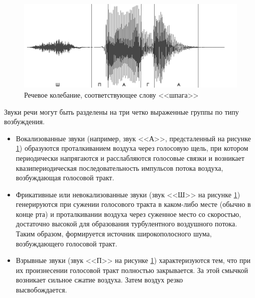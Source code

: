 \documentclass[a4paper,14pt,russian,utf8,nocolumnsxix,nocolumnxxxi,nocolumnxxxii]{eskdtext}
\begin{document}
\begin{figure}[h]	
	\centering
	\includegraphics[width=120mm]{shpaga_graph.png}			
	\caption{Речевое колебание, соответствующее слову <<шпага>>}
	\label{shpaga_graph}
\end{figure}
Звуки речи могут быть разделены на три четко выраженные группы по типу возбуждения.
\begin{itemize}

\item Вокализованные звуки (например, звук <<А>>, предсталенный на рисунке \ref{shpaga_graph}) образуются проталкиванием воздуха через голосовую щель, при котором периодически напрягаются и расслабляются голосовые связки и возникает квазипериодическая последовательность импульсов потока воздуха, возбуждающая голосовой тракт.
\item Фрикативные или невокализованные звуки (звук <<Ш>> на рисунке \ref{shpaga_graph}) генерируются при сужении голосового тракта в каком-либо месте (обычно в конце рта) и проталкивании воздуха через суженное место со скоростью, достаточно высокой для образования турбулентного воздушного потока. Таким образом, формируется источник широкополосного шума, возбуждающего голосовой тракт. 
\item Взрывные звуки (звук <<П>> на рисунке \ref{shpaga_graph}) характеризуются тем, что при их произнесении голосовой тракт полностью закрывается. За этой смычкой возникает сильное сжатие воздуха. Затем воздух резко\\ высвобождается.\cite{rabiner1}
\end{itemize}
\end{document}
